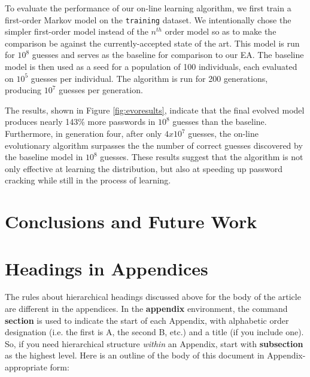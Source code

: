 \documentclass{acm_proc_article-sp}
\begin{document}
To evaluate the performance of our on-line learning algorithm, we first train a first-order Markov model on the \texttt{training} dataset. We intentionally chose the simpler first-order model instead of the $n^{th}$ order model so as to make the comparison be against the currently-accepted state of the art. This model is run for $10^{8}$ guesses and serves as the baseline for comparison to our EA. The baseline model is then used as a seed for a population of 100 individuals, each evaluated on $10^{5}$ guesses per individual. The algorithm is run for 200 generations, producing $10^{7}$ guesses per generation.

The results, shown in Figure \ref{fig:evoresults}, indicate that the final evolved model produces nearly 143\% more passwords in $10^{8}$ guesses than the baseline. Furthermore, in generation four, after only $4x10^{7}$ guesses, the on-line evolutionary algorithm surpasses the the number of correct guesses discovered by the baseline model in $10^{8}$ guesses. These results suggest that the algorithm is not only effective at learning the distribution, but also at speeding up password cracking while still in the process of learning.

\section{Conclusions and Future Work}
\label{sec:conclusions}




%

%
%
\appendix
\section{Headings in Appendices}
The rules about hierarchical headings discussed above for
the body of the article are different in the appendices.
In the \textbf{appendix} environment, the command
\textbf{section} is used to
indicate the start of each Appendix, with alphabetic order
designation (i.e. the first is A, the second B, etc.) and
a title (if you include one).  So, if you need
hierarchical structure
\textit{within} an Appendix, start with \textbf{subsection} as the
highest level. Here is an outline of the body of this
document in Appendix-appropriate form:
\end{document}
